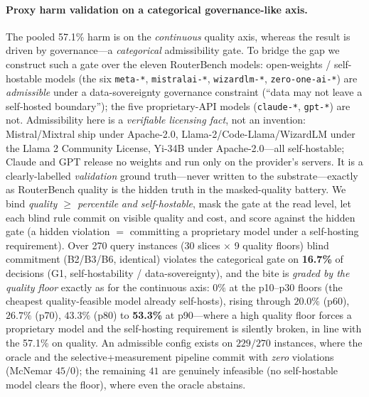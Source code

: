 \documentclass{article} %
\begin{document}
\paragraph{Proxy harm validation on a categorical governance-like axis.}
The pooled 57.1\% harm is on the \emph{continuous} quality axis, whereas the result is driven by governance---a \emph{categorical} admissibility gate. To bridge the gap we construct such a gate over the eleven RouterBench models: open-weights / self-hostable models (the six \texttt{meta-*}, \texttt{mistralai-*}, \texttt{wizardlm-*}, \texttt{zero-one-ai-*}) are \emph{admissible} under a data-sovereignty governance constraint (``data may not leave a self-hosted boundary''); the five proprietary-API models (\texttt{claude-*}, \texttt{gpt-*}) are not. Admissibility here is a \emph{verifiable licensing fact}, not an invention: Mistral/Mixtral ship under Apache-2.0, Llama-2/Code-Llama/WizardLM under the Llama 2 Community License, Yi-34B under Apache-2.0---all self-hostable; Claude and GPT release no weights and run only on the provider's servers. It is a clearly-labelled \emph{validation} ground truth---never written to the substrate---exactly as RouterBench quality is the hidden truth in the masked-quality battery. We bind \emph{quality $\ge$ percentile} \emph{and} \emph{self-hostable}, mask the gate at the read level, let each blind rule commit on visible quality and cost, and score against the hidden gate (a hidden violation $=$ committing a proprietary model under a self-hosting requirement). Over 270 query instances (30 slices $\times$ 9 quality floors) blind commitment (B2/B3/B6, identical) violates the categorical gate on \textbf{16.7\%} of decisions (G1, self-hostability / data-sovereignty), and the bite is \emph{graded by the quality floor} exactly as for the continuous axis: $0\%$ at the p10--p30 floors (the cheapest quality-feasible model already self-hosts), rising through $20.0\%$ (p60), $26.7\%$ (p70), $43.3\%$ (p80) to \textbf{53.3\%} at p90---where a high quality floor forces a proprietary model and the self-hosting requirement is silently broken, in line with the 57.1\% on quality. An admissible config exists on $229/270$ instances, where the oracle and the selective+measurement pipeline commit with \emph{zero} violations (McNemar $45/0$); the remaining $41$ are genuinely infeasible (no self-hostable model clears the floor), where even the oracle abstains.
\end{document}
